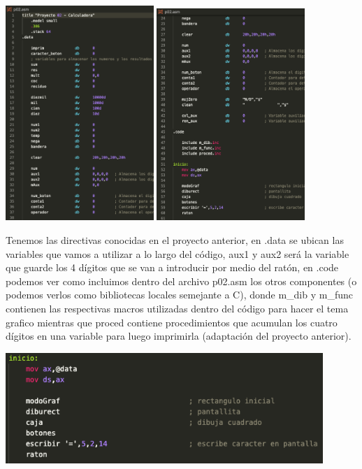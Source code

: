 \documentclass[letterpaper,12 pt,titlepage]{article}
\begin{document}
    \begin{center}
        \includegraphics[width=0.42\textwidth]{img/02.png}
        \includegraphics[width=0.42\textwidth]{img/03.png}
    \end{center}

    Tenemos las directivas conocidas en el proyecto anterior, en .data se ubican las variables que vamos a utilizar a lo largo del código, aux1 y aux2 será la variable que guarde los 4 dígitos que se van a introducir por medio del ratón, en .code podemos ver como incluimos dentro del archivo p02.asm los otros componentes (o podemos verlos como bibliotecas locales semejante a C), donde m\_dib y m\_func contienen las respectivas macros utilizadas dentro del código para hacer el tema grafico mientras que proced contiene procedimientos que acumulan los cuatro dígitos en una variable para luego imprimirla (adaptación del proyecto anterior).

    \begin{center}
        \includegraphics[width=0.9\textwidth]{img/04.png}
    \end{center}
    
\end{document}
